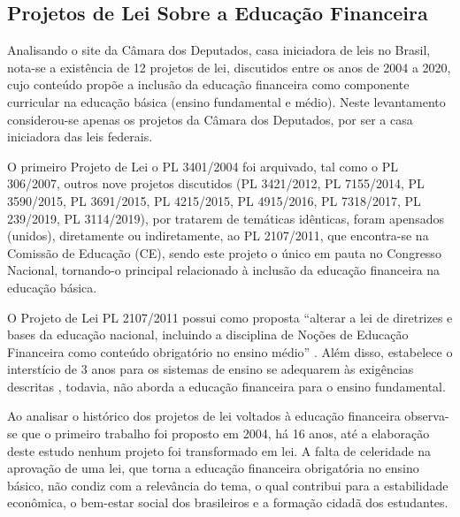 \subsection{Projetos de Lei Sobre a Educação Financeira}
Analisando o site da Câmara dos Deputados, casa iniciadora de leis no Brasil, nota-se a existência de 12 projetos de lei, discutidos entre os anos de 2004 a 2020, cujo conteúdo propõe a inclusão da educação financeira como componente curricular na educação básica (ensino fundamental e médio). Neste levantamento considerou-se apenas os projetos da Câmara dos Deputados, por ser a casa iniciadora das leis federais.

O primeiro Projeto de Lei o PL 3401/2004 foi arquivado, tal como o PL 306/2007, outros nove projetos discutidos (PL 3421/2012, PL 7155/2014, PL 3590/2015, PL 3691/2015, PL 4215/2015, PL 4915/2016, PL 7318/2017, PL 239/2019, PL 3114/2019), por tratarem de temáticas idênticas, foram apensados (unidos), diretamente ou indiretamente, ao PL 2107/2011, que encontra-se na Comissão de Educação (CE), sendo este projeto o único em pauta no Congresso Nacional, tornando-o principal relacionado à inclusão da educação financeira na educação básica.

O Projeto de Lei PL 2107/2011 possui como proposta “alterar a lei de diretrizes e bases da educação nacional, incluindo a disciplina de Noções de Educação Financeira como conteúdo obrigatório no ensino médio” \cite{brasil2011}. Além disso, estabelece o interstício de 3 anos para os sistemas de ensino se adequarem às exigências descritas \cite{brasil2011}, todavia, não aborda a educação financeira para o ensino fundamental.

Ao analisar o histórico dos projetos de lei voltados à educação financeira observa-se que o primeiro trabalho foi proposto em 2004, há 16 anos, até a elaboração deste estudo nenhum projeto foi transformado em lei. A falta de celeridade na aprovação de uma lei, que torna a educação financeira obrigatória no ensino básico, não condiz com a relevância do tema, o qual contribui para a estabilidade econômica, o bem-estar social dos brasileiros e a formação cidadã dos estudantes.

